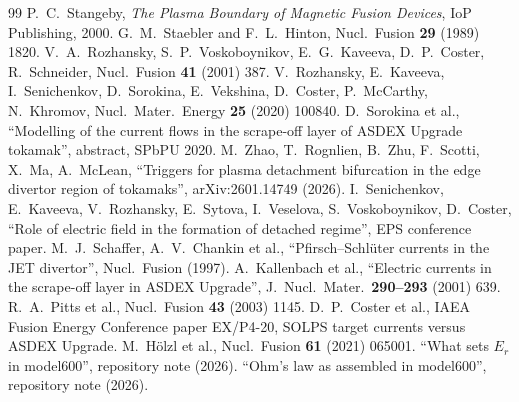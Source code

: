 \documentclass[11pt,a4paper]{article}
\begin{document}
\begin{thebibliography}{99}
 P.~C.~Stangeby, \emph{The Plasma Boundary of Magnetic Fusion Devices}, IoP Publishing, 2000.
 G.~M.~Staebler and F.~L.~Hinton, Nucl.\ Fusion \textbf{29} (1989) 1820.
 V.~A.~Rozhansky, S.~P.~Voskoboynikov, E.~G.~Kaveeva, D.~P.~Coster, R.~Schneider, Nucl.\ Fusion \textbf{41} (2001) 387.
 V.~Rozhansky, E.~Kaveeva, I.~Senichenkov, D.~Sorokina, E.~Vekshina, D.~Coster, P.~McCarthy, N.~Khromov, Nucl.\ Mater.\ Energy \textbf{25} (2020) 100840.
 D.~Sorokina et al., ``Modelling of the current flows in the scrape-off layer of ASDEX Upgrade tokamak'', abstract, SPbPU 2020.
 M.~Zhao, T.~Rognlien, B.~Zhu, F.~Scotti, X.~Ma, A.~McLean, ``Triggers for plasma detachment bifurcation in the edge divertor region of tokamaks'', arXiv:2601.14749 (2026).
 I.~Senichenkov, E.~Kaveeva, V.~Rozhansky, E.~Sytova, I.~Veselova, S.~Voskoboynikov, D.~Coster, ``Role of electric field in the formation of detached regime'', EPS conference paper.
 M.~J.~Schaffer, A.~V.~Chankin et al., ``Pfirsch--Schl\"uter currents in the JET divertor'', Nucl.\ Fusion (1997).
 A.~Kallenbach et al., ``Electric currents in the scrape-off layer in ASDEX Upgrade'', J.\ Nucl.\ Mater.\ \textbf{290--293} (2001) 639.
 R.~A.~Pitts et al., Nucl.\ Fusion \textbf{43} (2003) 1145.
 D.~P.~Coster et al., IAEA Fusion Energy Conference paper EX/P4-20, SOLPS target currents versus ASDEX Upgrade.
 M.~H\"olzl et al., Nucl.\ Fusion \textbf{61} (2021) 065001.
 ``What sets $E_r$ in model600'', repository note  (2026).
 ``Ohm's law as assembled in model600'', repository note  (2026).
\end{thebibliography}
\end{document}

